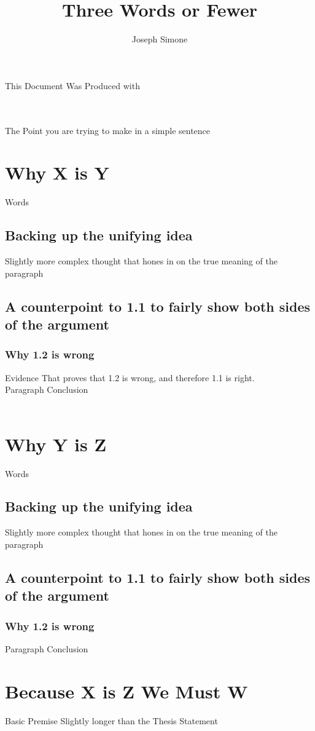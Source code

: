 \documentclass[oneside,12pt,letterpaper]{article}
\author{Joseph Simone}
\title{Three Words or Fewer}
\begin{document}
This Document Was Produced with \latex
\maketitle
\\
\tableofcontents
\\
The Point you are trying to make in a simple sentence
\section[My First Point]{Why X is Y}
Words
\subsection[Point 1.1]{Backing up the unifying idea}
Slightly more complex thought that hones in on the true meaning of the paragraph
\subsection[Point 1.2]{A counterpoint to 1.1 to fairly show both sides of the argument}
\subsubsection[1.2.A]{Why 1.2 is wrong}
Evidence \cite{evid} That proves that 1.2 is wrong, and therefore 1.1 is right. \\

Paragraph Conclusion
\\
\\
\section[My Second Point]{Why Y is Z}
Words
\subsection[Point 2.1]{Backing up the unifying idea}
Slightly more complex thought that hones in on the true meaning of the paragraph
\subsection[Point 2.2]{A counterpoint to 1.1 to fairly show both sides of the argument}
\subsubsection[2.2.A]{Why 1.2 is wrong}
Paragraph Conclusion

\section[Call to Action]{Because X is Z We Must W}
Basic Premise Slightly longer than the Thesis Statement
\end{document}
